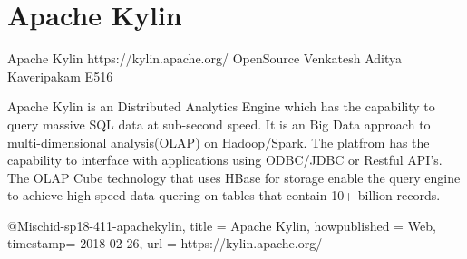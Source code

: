 \section{Apache Kylin}

Apache Kylin
https://kylin.apache.org/
OpenSource
Venkatesh Aditya Kaveripakam
E516

Apache Kylin is an Distributed Analytics Engine which has the capability to
query massive SQL data at sub-second speed. It is an Big Data approach to
multi-dimensional analysis(OLAP) on Hadoop/Spark. The platfrom has the
capability to interface with applications using ODBC/JDBC or Restful API's.
The OLAP Cube technology that uses HBase for storage enable the query engine
to achieve high speed data quering on tables that contain 10+ billion records.

@Misc{hid-sp18-411-apachekylin,
title = {Apache Kylin},
howpublished = {Web},
timestamp= {2018-02-26},
url = {https://kylin.apache.org/}
}